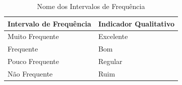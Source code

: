 	\begin{table}[!ht]
	\begin{center}
	 \begin{tabular}{|l|l|}
		\hline
		Intervalo de Frequência & Indicador Qualitativo \\ \hline
		Muito Frequente & Excelente \\ \hline
		Frequente       & Bom       \\ \hline
		Pouco Frequente & Regular   \\ \hline
		Não Frequente   & Ruim      \\ \hline
		\end{tabular}
		\caption{Nome dos Intervalos de Frequência}
		\label{nomes}
		\end{center}
		\end{table}
		
\FloatBarrier
	
